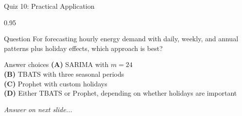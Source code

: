 \documentclass[9pt, aspectratio=169, t]{beamer}
\begin{document}
\begin{frame}{Quiz 10: Practical Application}
    \begin{cminipage}{0.95\textwidth}
    \begin{alertblock}{Question}
        For forecasting hourly energy demand with daily, weekly, and annual patterns plus holiday effects, which approach is best?
    \end{alertblock}

    \vspace{0.4cm}

    \begin{block}{Answer choices}
        \textcolor{MainBlue}{\textbf{(A)}} SARIMA with $m=24$\\[3pt]
        \textcolor{MainBlue}{\textbf{(B)}} TBATS with three seasonal periods\\[3pt]
        \textcolor{MainBlue}{\textbf{(C)}} Prophet with custom holidays\\[3pt]
        \textcolor{MainBlue}{\textbf{(D)}} Either TBATS or Prophet, depending on whether holidays are important
    \end{block}

    \vspace{0.5cm}

    \begin{center}
        \textit{Answer on next slide...}
    \end{center}
    \end{cminipage}
\end{frame}
\end{document}
